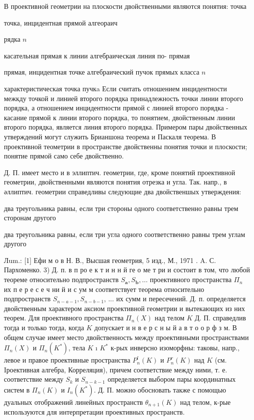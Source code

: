 \documentclass[10pt]{article}
\begin{document}
В проективной геометрии на плоскости двойственными являются понятия: точка



точка, инцидентная прямой алгеораич

рядка $n$



касательная прямая $к$ линии алгебраическая линия по- прямая



прямая, инцидентная точке алгебраический пучок прямых класса $n$



характеристическая точка пучкa Если считать отношением инцидентности межкду точкой и линией второго порядка принадлежность точки линии второго порядка, а отношением инцидентности прямой с линией второго порядка - касание прямой к линии второго порядка, то понятием, двойственным линии второго порядка, является линия второго порядка. Примером пары двойственных утверждений могут служить Брианшона теорема и Паскаля теорема. В проективной теометрии в пространстве двойственны понятия точки и плоскости; понятие прямой само себе двойственно.



Д. П. имеет место и в эллиптич. геометрии, где, кроме понятий проективной геометрии, двойственными являются понятия отрезка и угла. Так. напр., в әллиптич. геометрии справедливы следующие два двойственшых утверждения:



два треугольника равны, если три стороны одного соответственно равны трем сторонам другого



два треугольника равны, если три угла одного соответственно равны трем углам другого



Лum.: [1] Ефи м о в Н. В., Высшая геометрия, 5 изд., М., 1971 . A. С. Пархоменко. 3) Д. п. в п ро е к т и н н й ге о ме т ри и состоит в том, что любой теореме относительно подпространств $S_{\boldsymbol{a}}, S_{\boldsymbol{b}}, \ldots$ проективного пространства $\Pi_{n}$ их п е р е с е ч ни й и с ум м соответствует теорема относительно подпространств $S_{n-a-1}, S_{n-b-1}$, ... их сумм и пересечений. Д. п. определяется двойственным характером аксиом проективной геометрии и вытекающих из них теорем. Для проективного пространства $\Pi_{n}(X)$ над телом $K$ Д. П. справедлив тогда и только тогда, когда $K$ допускает и н в е р с н ы й а в т о о р ф з м. В общем случае имеет место двойственность между проективными пространствами $\Pi_{n}(X)$ и $\Pi_{n}\left(K^{*}\right)$, тела $K$ ı $K^{*}$ к-рых инверсно изоморфны: таковы, напр., левое и правое проективные пространства $P_{n}^{l}(K)$ и $P_{n}^{r}(K)$ над $K$ (см. Iроективная алгебра, Корреляция), причем соответствие между ними, т. е. соответствие между $S_{k}$ и $S_{n-k-1}$ определяется выбором пары координатных систем в $\Pi_{n}(K)$ и $I_{n}\left(K^{*}\right)$. Д. П. можно обосновать также с помощью дуальных отображений линейных пространств $\theta_{n+1}(K)$ над телом, к-рые используются для интерпретации проективных пространств.
\end{document}
